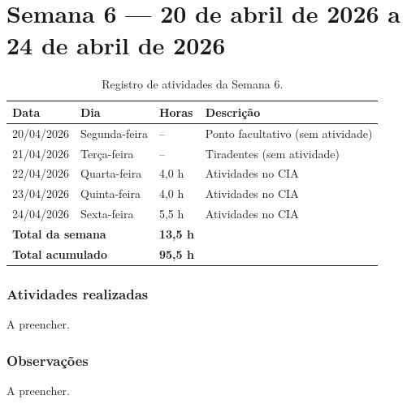
\section{Semana 6 --- 20 de abril de 2026 a 24 de abril de 2026}

\begin{table}[H]
\centering
\caption{Registro de atividades da Semana 6.}
\begin{tabular}{llll}
\toprule
\textbf{Data} & \textbf{Dia} & \textbf{Horas} & \textbf{Descrição} \\
\midrule
20/04/2026 & Segunda-feira & -- & Ponto facultativo (sem atividade) \\
21/04/2026 & Terça-feira & -- & Tiradentes (sem atividade) \\
22/04/2026 & Quarta-feira & 4,0 h & Atividades no CIA \\
23/04/2026 & Quinta-feira & 4,0 h & Atividades no CIA \\
24/04/2026 & Sexta-feira & 5,5 h & Atividades no CIA \\
\midrule
\multicolumn{2}{l}{\textbf{Total da semana}} & \textbf{13,5 h} & \\
\multicolumn{2}{l}{\textbf{Total acumulado}} & \textbf{95,5 h} & \\
\bottomrule
\end{tabular}
\end{table}

\subsubsection*{Atividades realizadas}

A preencher.

\subsubsection*{Observações}

A preencher.
